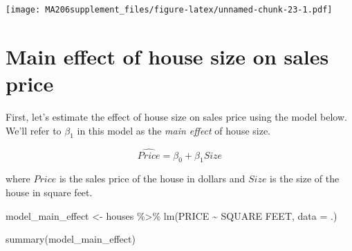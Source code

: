 \documentclass[
]{book}
\newenvironment{Shaded}{\begin{snugshade}}{\end{snugshade}}
\newcommand{\AttributeTok}[1]{\textcolor[rgb]{0.77,0.63,0.00}{#1}}
\newcommand{\FunctionTok}[1]{\textcolor[rgb]{0.00,0.00,0.00}{#1}}
\newcommand{\NormalTok}[1]{#1}
\newcommand{\OtherTok}[1]{\textcolor[rgb]{0.56,0.35,0.01}{#1}}
\newcommand{\SpecialCharTok}[1]{\textcolor[rgb]{0.00,0.00,0.00}{#1}}
\newcommand{\StringTok}[1]{\textcolor[rgb]{0.31,0.60,0.02}{#1}}
\begin{document}
\begin{Shaded}
\end{Shaded}

\texttt{[image: MA206supplement\_files/figure-latex/unnamed-chunk-23-1.pdf]}

\hypertarget{main-effect-of-house-size-on-sales-price}{%
\section{Main effect of house size on sales price}\label{main-effect-of-house-size-on-sales-price}}

First, let's estimate the effect of house size on sales price using the model below. We'll refer to \(\beta_1\) in this model as the \emph{main effect} of house size.

\[\widehat{Price} = \beta_0 + \beta_1 Size\]

where \(Price\) is the sales price of the house in dollars and \(Size\) is the size of the house in square feet.

\begin{Shaded}
\begin{Highlighting}[]
\NormalTok{model\_main\_effect }\OtherTok{\textless{}{-}}\NormalTok{ houses }\SpecialCharTok{\%\textgreater{}\%} 
  \FunctionTok{lm}\NormalTok{(PRICE }\SpecialCharTok{\textasciitilde{}} \StringTok{\textasciigrave{}}\AttributeTok{SQUARE FEET}\StringTok{\textasciigrave{}}\NormalTok{, }\AttributeTok{data =}\NormalTok{ .)}

\FunctionTok{summary}\NormalTok{(model\_main\_effect)}
\end{Highlighting}
\end{Shaded}
\end{document}
